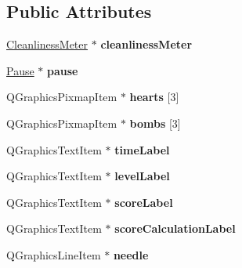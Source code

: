 \subsection*{Public Attributes}
\begin{DoxyCompactItemize}
\item 
\hypertarget{classHeader_a54be6087baca716a9292e5167fe202a6}{\hyperlink{classCleanlinessMeter}{Cleanliness\-Meter} $\ast$ {\bfseries cleanliness\-Meter}}\label{classHeader_a54be6087baca716a9292e5167fe202a6}

\item 
\hypertarget{classHeader_a553e85cea35e1741289a29d4be789030}{\hyperlink{classPause}{Pause} $\ast$ {\bfseries pause}}\label{classHeader_a553e85cea35e1741289a29d4be789030}

\item 
\hypertarget{classHeader_a4ee68fceb0cc90edfdbc60d22337cc1d}{Q\-Graphics\-Pixmap\-Item $\ast$ {\bfseries hearts} \mbox{[}3\mbox{]}}\label{classHeader_a4ee68fceb0cc90edfdbc60d22337cc1d}

\item 
\hypertarget{classHeader_a7464258724785cc5a337c1dfffc31c77}{Q\-Graphics\-Pixmap\-Item $\ast$ {\bfseries bombs} \mbox{[}3\mbox{]}}\label{classHeader_a7464258724785cc5a337c1dfffc31c77}

\item 
\hypertarget{classHeader_a934ddf4ece375a0e6f6c36ca6dd83976}{Q\-Graphics\-Text\-Item $\ast$ {\bfseries time\-Label}}\label{classHeader_a934ddf4ece375a0e6f6c36ca6dd83976}

\item 
\hypertarget{classHeader_aca0e61105e8794506e30b8ff6ac12e04}{Q\-Graphics\-Text\-Item $\ast$ {\bfseries level\-Label}}\label{classHeader_aca0e61105e8794506e30b8ff6ac12e04}

\item 
\hypertarget{classHeader_a5f9ab3bc1db27b933956d26b6209e031}{Q\-Graphics\-Text\-Item $\ast$ {\bfseries score\-Label}}\label{classHeader_a5f9ab3bc1db27b933956d26b6209e031}

\item 
\hypertarget{classHeader_ade38e66c5f7ce36035160c231f39e322}{Q\-Graphics\-Text\-Item $\ast$ {\bfseries score\-Calculation\-Label}}\label{classHeader_ade38e66c5f7ce36035160c231f39e322}

\item 
\hypertarget{classHeader_ab974256995a71056eb97c8018246d8e2}{Q\-Graphics\-Line\-Item $\ast$ {\bfseries needle}}\label{classHeader_ab974256995a71056eb97c8018246d8e2}


\end{DoxyCompactItemize}

